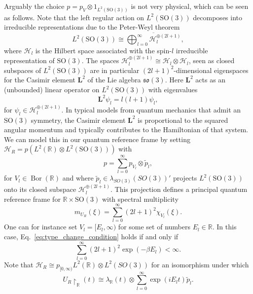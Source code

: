 \documentclass[sn-mathphys-num]{sn-jnl}%
\newcommand{\RR}{\mathbb{R}}
\newcommand{\HH}{\mathcal{H}}
\DeclareMathOperator{\Bor}{Bor}
\numberwithin{equation}{section}
\theoremstyle{thmstyleone}%
\theoremstyle{thmstyletwo}%
\theoremstyle{thmstylethree}%
\begin{document}
Arguably the choice $p=p_V\otimes 1_{L^2(\mathrm{SO}(3))}$ is not very physical, which can be seen as follows. Note that the left regular action on $L^2(\mathrm{SO}(3))$ decomposes into irreducible representations due to the Peter-Weyl theorem \cite[Thm.\ 1.12]{Knapp_rep_semisimple}
\begin{equation}
    L^2(\mathrm{SO}(3))\cong \overline{\bigoplus_{l=0}^{\infty}\HH_{l}^{\oplus(2l+1)}},
\end{equation}
where $\HH_{l}$ is the Hilbert space associated with the spin-$l$ irreducible representation of $\mathrm{SO}(3)$. The spaces $\HH_{l}^{\oplus(2l+1)}\cong \HH_l\otimes\HH_l$, seen as closed subspaces of $L^2(\mathrm{SO}(3))$ are in particular $(2l+1)^2$-dimensional eigenspaces for the Casimir element $\mathbf{L}^2$ of the Lie algebra $\mathfrak{so}(3)$. Here $\mathbf{L}^2$ acts as an (unbounded) linear operator on $L^2(\mathrm{SO}(3))$ with eigenvalues \begin{equation}
    \mathbf{L}^2\psi_l=l(l+1)\psi_{l},
\end{equation} 
for $\psi_l\in \HH_{l}^{\oplus(2l+1)}$. In typical models from quantum mechanics that admit an $\mathrm{SO}(3)$ symmetry, the Casimir element $\mathbf{L}^2$ is proportional to the squared angular momentum and typically contributes to the Hamiltonian of that system. We can model this in our quantum reference frame by setting $\HH_R=p (L^2(\RR)\otimes L^2(\mathrm{SO}(3)))$ with
\begin{equation}
    p=\sum_{l=0}^\infty p_{V_l}\otimes \tilde{p}_l,
\end{equation}
for $V_l\in\Bor(\RR)$ and where $\tilde{p}_l\in \lambda_{SO(3)}(SO(3))'$ projects $L^2(\mathrm{SO}(3))$ onto its closed subspace $\HH_{l}^{\oplus(2l+1)}$. This projection defines a principal quantum reference frame for $\RR\times \mathrm{SO}(3)$ with spectral multiplicity
\begin{equation}
    m_{U_R}(\xi)=\sum_{l=0}^\infty (2l+1)^2\chi_{V_l}(\xi).
\end{equation}
One can for instance set 
$V_l=[E_l,\infty)$ for some set of numbers $E_l\in \RR$. In this case, Eq.\ \eqref{eq:type_change_condition} holds if and only if 
\begin{equation}
    \sum_{l=0}^\infty (2l+1)^2\exp(-\beta E_l)<\infty.
\end{equation}
Note that $\HH_R\cong p_{[0,\infty)}L^2(\RR)\otimes L^2(SO(3))$ for an isomorphism under which \begin{equation}
    U_R\restriction_{\RR}(t)\cong\lambda_\RR(t)\otimes \sum_{l=0}^\infty \exp(i E_l t)\tilde{p}_l.
\end{equation}
\end{document}
